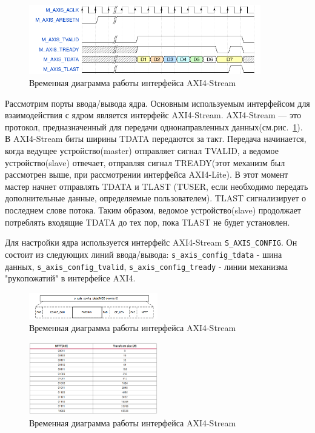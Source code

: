 \begin{figure}[h]
	\centering
	\includegraphics[width=0.9\textwidth]{image/axis_0.png}
	\caption{Временная диаграмма работы интерфейса AXI4-Stream}
	\label{axis}
\end{figure}

Рассмотрим порты ввода/вывода ядра. Основным используемым интерфейсом для взаимодействия с ядром является интерфейс AXI4-Stream. AXI4-Stream — это протокол, предназначенный для передачи однонаправленных данных(см.рис.~\ref{axis}). В AXI4-Stream биты ширины TDATA передаются за такт. Передача начинается, когда ведущее устройство(master) отправляет сигнал TVALID, а ведомое устройство(slave) отвечает, отправляя сигнал TREADY(этот механизм был рассмотрен выше, при рассмотрении интерфейса AXI4-Lite). В этот момент мастер начнет отправлять TDATA и TLAST (TUSER, если необходимо передать дополнительные данные, определяемые пользователем). TLAST сигнализирует о последнем слове потока. Таким образом, ведомое устройство(slave) продолжает потреблять входящие TDATA до тех пор, пока TLAST не будет установлен.

Для настройки ядра используется интерфейс AXI4-Stream \verb|S_AXIS_CONFIG|. 
Он состоит из следующих линий ввода/вывода: \verb|s_axis_config_tdata| - шина данных,
\verb|s_axis_config_tvalid|, \verb|s_axis_config_tready| - линии механизма "рукопожатий" в интерфейсе AXI4.

\begin{figure}[h]
	\centering
	\includegraphics[width=0.5\textwidth]{image/FFT_AXIS_CONFIG.png}
	\caption{Временная диаграмма работы интерфейса AXI4-Stream}
	\label{fft_detailed_implem}
\end{figure}

\begin{figure}[h]
	\centering
	\includegraphics[width=0.5\textwidth]{image/FFT_LENGTH.PNG}
	\caption{Временная диаграмма работы интерфейса AXI4-Stream}
	\label{fft_detailed_implem}
\end{figure}

